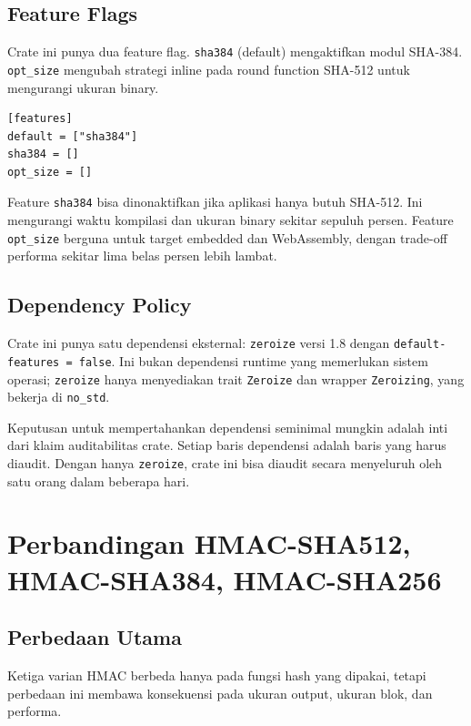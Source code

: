 \documentclass[11pt,a4paper]{article}
\begin{document}
\subsection{Feature Flags}

Crate ini punya dua feature flag. \texttt{sha384} (default) mengaktifkan modul SHA-384. \texttt{opt\_size} mengubah strategi inline pada round function SHA-512 untuk mengurangi ukuran binary.

\begin{lstlisting}[style=code]
[features]
default = ["sha384"]
sha384 = []
opt_size = []
\end{lstlisting}

Feature \texttt{sha384} bisa dinonaktifkan jika aplikasi hanya butuh SHA-512. Ini mengurangi waktu kompilasi dan ukuran binary sekitar sepuluh persen. Feature \texttt{opt\_size} berguna untuk target embedded dan WebAssembly, dengan trade-off performa sekitar lima belas persen lebih lambat.

\subsection{Dependency Policy}

Crate ini punya satu dependensi eksternal: \texttt{zeroize} versi 1.8 dengan \texttt{default-features = false}. Ini bukan dependensi runtime yang memerlukan sistem operasi; \texttt{zeroize} hanya menyediakan trait \texttt{Zeroize} dan wrapper \texttt{Zeroizing}, yang bekerja di \texttt{no\_std}.

Keputusan untuk mempertahankan dependensi seminimal mungkin adalah inti dari klaim auditabilitas crate. Setiap baris dependensi adalah baris yang harus diaudit. Dengan hanya \texttt{zeroize}, crate ini bisa diaudit secara menyeluruh oleh satu orang dalam beberapa hari.

\section{Perbandingan HMAC-SHA512, HMAC-SHA384, HMAC-SHA256}

\subsection{Perbedaan Utama}

Ketiga varian HMAC berbeda hanya pada fungsi hash yang dipakai, tetapi perbedaan ini membawa konsekuensi pada ukuran output, ukuran blok, dan performa.
\end{document}
